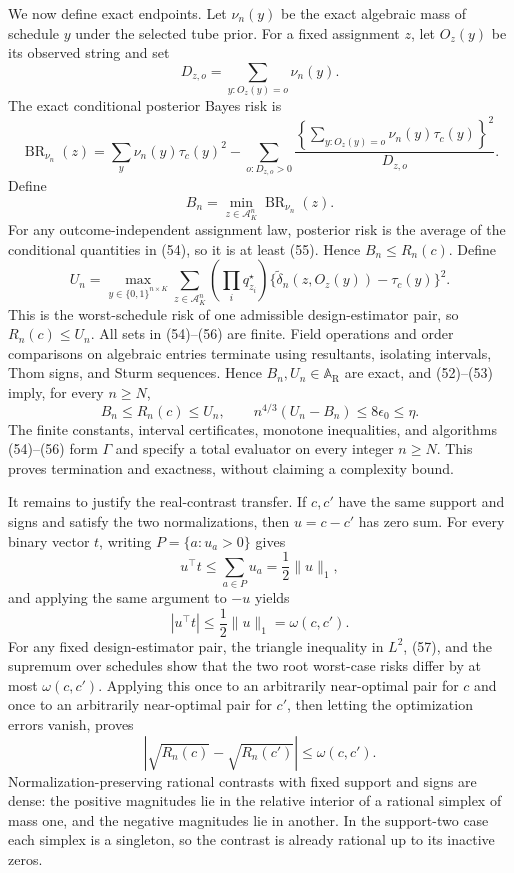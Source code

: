 We now define exact endpoints.  Let \(\nu_n(y)\) be the exact algebraic mass of schedule \(y\) under the selected tube prior.  For a fixed assignment \(z\), let \(O_z(y)\) be its observed string and set
\[
D_{z,o}=\sum_{y:O_z(y)=o}\nu_n(y).
\]
The exact conditional posterior Bayes risk is
\[
\operatorname{BR}_{\nu_n}(z)
=\sum_y\nu_n(y)\tau_c(y)^2
-\sum_{o:D_{z,o}>0}
\frac{\left\{\sum_{y:O_z(y)=o}\nu_n(y)\tau_c(y)\right\}^2}{D_{z,o}}.
\tag{54}
\]
Define
\[
B_n=\min_{z\in\mathcal A_K^n}\operatorname{BR}_{\nu_n}(z).
\tag{55}
\]
For any outcome-independent assignment law, posterior risk is the average of the conditional quantities in (54), so it is at least (55).  Hence \(B_n\le R_n(c)\).  Define
\[
U_n=\max_{y\in\{0,1\}^{n\times K}}
\sum_{z\in\mathcal A_K^n}\left(\prod_iq_{z_i}^\star\right)
\{\widetilde\delta_n(z,O_z(y))-\tau_c(y)\}^2.
\tag{56}
\]
This is the worst-schedule risk of one admissible design-estimator pair, so \(R_n(c)\le U_n\).  All sets in (54)--(56) are finite.  Field operations and order comparisons on algebraic entries terminate using resultants, isolating intervals, Thom signs, and Sturm sequences.  Hence \(B_n,U_n\in\mathbb A_{\mathrm R}\) are exact, and (52)--(53) imply, for every \(n\ge N\),
\[
B_n\le R_n(c)\le U_n,
\qquad
n^{4/3}(U_n-B_n)\le8\epsilon_0\le\eta.
\]
The finite constants, interval certificates, monotone inequalities, and algorithms (54)--(56) form \(\Gamma\) and specify a total evaluator on every integer \(n\ge N\).  This proves termination and exactness, without claiming a complexity bound.

It remains to justify the real-contrast transfer.  If \(c,c'\) have the same support and signs and satisfy the two normalizations, then \(u=c-c'\) has zero sum.  For every binary vector \(t\), writing \(P=\{a:u_a>0\}\) gives
\[
u^\top t\le\sum_{a\in P}u_a=\frac12\|u\|_1,
\]
and applying the same argument to \(-u\) yields
\[
|u^\top t|\le\frac12\|u\|_1=\omega(c,c').
\tag{57}
\]
For any fixed design-estimator pair, the triangle inequality in \(L^2\), (57), and the supremum over schedules show that the two root worst-case risks differ by at most \(\omega(c,c')\).  Applying this once to an arbitrarily near-optimal pair for \(c\) and once to an arbitrarily near-optimal pair for \(c'\), then letting the optimization errors vanish, proves
\[
|\sqrt{R_n(c)}-\sqrt{R_n(c')}|\le\omega(c,c').
\tag{58}
\]
Normalization-preserving rational contrasts with fixed support and signs are dense: the positive magnitudes lie in the relative interior of a rational simplex of mass one, and the negative magnitudes lie in another.  In the support-two case each simplex is a singleton, so the contrast is already rational up to its inactive zeros.

